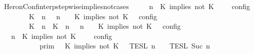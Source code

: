 \begin{isabellebody}
\ HeronConf{\isacharunderscore}interp{\isacharunderscore}stepwise{\isacharunderscore}implies{\isacharunderscore}not{\isacharunderscore}cases{\isacharcolon}\isanewline
\ \ \ {\isacartoucheopen}{\isasymlbrakk}\ {\isasymGamma}{\isacharcomma}\ n\ {\isasymturnstile}\ {\isacharparenleft}{\isacharparenleft}K\ implies\ not\ K\ {\isacharhash}\ {\isasymPsi}{\isacharparenright}\ {\isasymtriangleright}\ {\isasymPhi}\ {\isasymrbrakk}\isactrlsub c\isactrlsub o\isactrlsub n\isactrlsub f\isactrlsub i\isactrlsub g\isanewline
\ \ \ \ \ \ {\isacharequal}\ {\isasymlbrakk}\ {\isacharparenleft}{\isacharparenleft}K\ {\isasymnot}{\isasymUp}\ n{\isacharparenright}\ {\isacharhash}\ {\isasymGamma}{\isacharparenright}{\isacharcomma}\ n\ {\isasymturnstile}\ {\isasymPsi}\ {\isasymtriangleright}\ {\isacharparenleft}{\isacharparenleft}K\ implies\ not\ K\ {\isacharhash}\ {\isasymPhi}{\isacharparenright}\ {\isasymrbrakk}\isactrlsub c\isactrlsub o\isactrlsub n\isactrlsub f\isactrlsub i\isactrlsub g\isanewline
\ \ \ \ \ \ {\isasymunion}\ {\isasymlbrakk}\ {\isacharparenleft}{\isacharparenleft}K\ {\isasymUp}\ n{\isacharparenright}\ {\isacharhash}\ {\isacharparenleft}K\ {\isasymnot}{\isasymUp}\ n{\isacharparenright}\ {\isacharhash}\ {\isasymGamma}{\isacharparenright}{\isacharcomma}\ n\ {\isasymturnstile}\ {\isasymPsi}\ {\isasymtriangleright}\ {\isacharparenleft}{\isacharparenleft}K\ implies\ not\ K\ {\isacharhash}\ {\isasymPhi}{\isacharparenright}\ {\isasymrbrakk}\isactrlsub c\isactrlsub o\isactrlsub n\isactrlsub f\isactrlsub i\isactrlsub g{\isacartoucheclose}\isanewline
%
\isadelimproof
%
\endisadelimproof
%
\isatagproof
{}\isamarkupfalse%
\ {\isacharminus}\isanewline
\ \ \isamarkupfalse%
\ {\isacartoucheopen}{\isasymlbrakk}\ {\isasymGamma}{\isacharcomma}\ n\ {\isasymturnstile}\ {\isacharparenleft}K\ implies\ not\ K\ {\isacharhash}\ {\isasymPsi}\ {\isasymtriangleright}\ {\isasymPhi}\ {\isasymrbrakk}\isactrlsub c\isactrlsub o\isactrlsub n\isactrlsub f\isactrlsub i\isactrlsub g\isanewline
\ \ \ \ \ \ \ \ {\isacharequal}\ {\isasymlbrakk}{\isasymlbrakk}\ {\isasymGamma}\ {\isasymrbrakk}{\isasymrbrakk}\isactrlsub p\isactrlsub r\isactrlsub i\isactrlsub m\ {\isasyminter}\ {\isasymlbrakk}{\isasymlbrakk}\ {\isacharparenleft}K\ implies\ not\ K\ {\isacharhash}\ {\isasymPsi}\ {\isasymrbrakk}{\isasymrbrakk}\isactrlsub T\isactrlsub E\isactrlsub S\isactrlsub L\isactrlbsup {\isasymge}\ n\isactrlesup \ {\isasyminter}\ {\isasymlbrakk}{\isasymlbrakk}\ {\isasymPhi}\ {\isasymrbrakk}{\isasymrbrakk}\isactrlsub T\isactrlsub E\isactrlsub S\isactrlsub L\isactrlbsup {\isasymge}\ Suc\ n\isactrlesup {\isacartoucheclose}\isanewline

\end{isabellebody}
